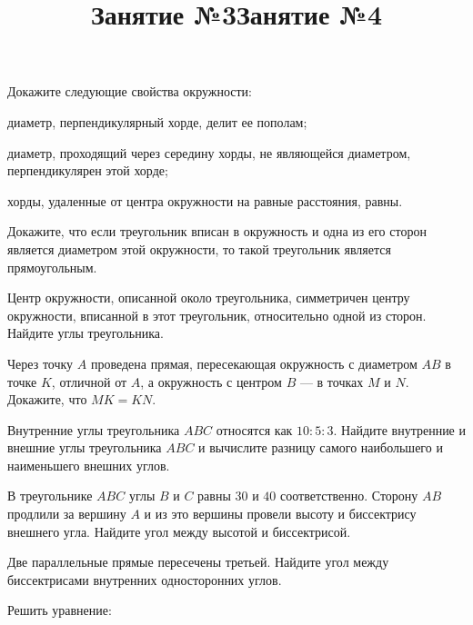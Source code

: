 \newpage
\title{Занятие №3}
\begin{listofex}
	\item Докажите следующие свойства окружности:
	\begin{enumcols}[itemcolumns=1]
		\item диаметр, перпендикулярный хорде, делит ее пополам;
		\item диаметр, проходящий через середину хорды, не являющейся диаметром, перпендикулярен этой хорде;
		\item хорды, удаленные от центра окружности на равные расстояния, равны.
	\end{enumcols}
	\item {}
	\item {}
	\item {}
	\item {}
	\item {}
	\item Докажите, что если треугольник вписан в окружность и одна из его сторон является диаметром этой окружности, то такой треугольник является прямоугольным.
	\item Центр окружности, описанной около треугольника, симметричен центру окружности, вписанной в этот треугольник, относительно одной из сторон. Найдите углы треугольника.
	\item Через точку \( A \) проведена прямая, пересекающая
	окружность с диаметром \( AB \) в точке \( K \), отличной от \( A \), а
	окружность с центром \( B \) --- в точках \( M \) и \( N \). Докажите, что \( MK = KN \).
\end{listofex}
\newpage
\title{Занятие №4}
\begin{listofex}
	\item Внутренние углы треугольника \( ABC \) относятся как \( 10:5:3 \). Найдите внутренние и внешние углы треугольника \( ABC \) и вычислите разницу самого наибольшего и наименьшего внешних углов. 
	\item В треугольнике \( ABC \) углы \( B \) и \( C \) равны \( 30 \) и \( 40 \) соответственно. Сторону \( AB \) продлили за вершину \( A \) и из это вершины провели высоту и биссектрису внешнего угла. Найдите угол между высотой и биссектрисой. 
	\item Две параллельные прямые пересечены третьей. Найдите угол между биссектрисами внутренних односторонних углов.
	\item {}
	\item {}
	\item {}
	\item {}
	\item Решить уравнение:
	\begin{enumcols}[itemcolumns=2]
		\item {}
		\item {}
	\end{enumcols}
\end{listofex}
